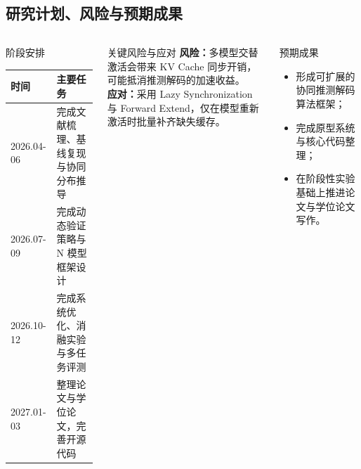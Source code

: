 \documentclass[8pt]{ctexbeamer}
\begin{document}
\subsection{研究计划、风险与预期成果}
\begin{frame}{\insertsection}{\insertsubsection}
    \begin{columns}[T,onlytextwidth]
        \begin{block}{阶段安排}
            \begin{table}
                \small
                \renewcommand{\arraystretch}{1.2}
                \setlength{\tabcolsep}{2mm}
                \begin{tabular}{p{}p{}}
                    \toprule
                    时间 & 主要任务 \\
                    \midrule
                    2026.04-06 & 完成文献梳理、基线复现与协同分布推导 \\
                    2026.07-09 & 完成动态验证策略与 N 模型框架设计 \\
                    2026.10-12 & 完成系统优化、消融实验与多任务评测 \\
                    2027.01-03 & 整理论文与学位论文，完善开源代码 \\
                    \bottomrule
                \end{tabular}
            \end{table}
        \end{block}

        \begin{block}{关键风险与应对}
            \textbf{风险：}多模型交替激活会带来 KV Cache 同步开销，可能抵消推测解码的加速收益。\\
            \textbf{应对：}采用 Lazy Synchronization 与 Forward Extend，仅在模型重新激活时批量补齐缺失缓存。
        \end{block}

        \begin{block}{预期成果}
            \begin{itemize}
                \item 形成可扩展的协同推测解码算法框架；
                \item 完成原型系统与核心代码整理；
                \item 在阶段性实验基础上推进论文与学位论文写作。
            \end{itemize}
        \end{block}
    \end{columns}
\end{frame}
\end{document}
